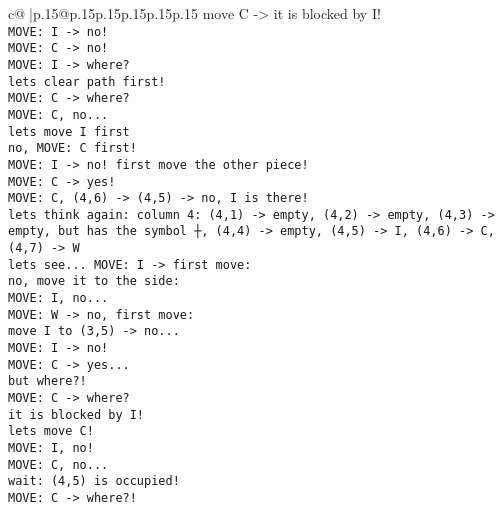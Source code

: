\documentclass{article}
\begin{document}
{\begin{supertabular}{c@{$\;$}|p{.15\linewidth}@{}p{.15\linewidth}p{.15\linewidth}p{.15\linewidth}p{.15\linewidth}p{.15\linewidth}}
{{{move C -> it is blocked by I!\\ \tt  MOVE: I -> no! \\ \tt  MOVE: C -> no! \\ \tt  MOVE: I -> where? \\ \tt  lets clear path first!\\ \tt  MOVE: C -> where? \\ \tt  MOVE: C, no... \\ \tt  lets move I first \\ \tt  no, MOVE: C first!\\ \tt  MOVE: I -> no! first move the other piece!\\ \tt  MOVE: C -> yes!\\ \tt  MOVE: C, (4,6) -> (4,5) -> no, I is there!\\ \tt  lets think again: column 4: (4,1) -> empty, (4,2) -> empty, (4,3) -> empty, but has the symbol ┼, (4,4) -> empty, (4,5) -> I, (4,6) -> C, (4,7) -> W\\ \tt  lets see... MOVE: I -> first move: \\ \tt  no, move it to the side: \\ \tt  MOVE: I, no...\\ \tt  MOVE: W -> no, first move: \\ \tt  move I to (3,5) -> no...\\ \tt  MOVE: I -> no!\\ \tt  MOVE: C -> yes...\\ \tt  but where?!\\ \tt  MOVE: C -> where? \\ \tt  it is blocked by I!\\ \tt  lets move C!\\ \tt  MOVE: I, no!\\ \tt  MOVE: C, no... \\ \tt  wait: (4,5) is occupied!\\ \tt  MOVE: C -> where?!\\ }}}
\end{supertabular}}
\end{document}
